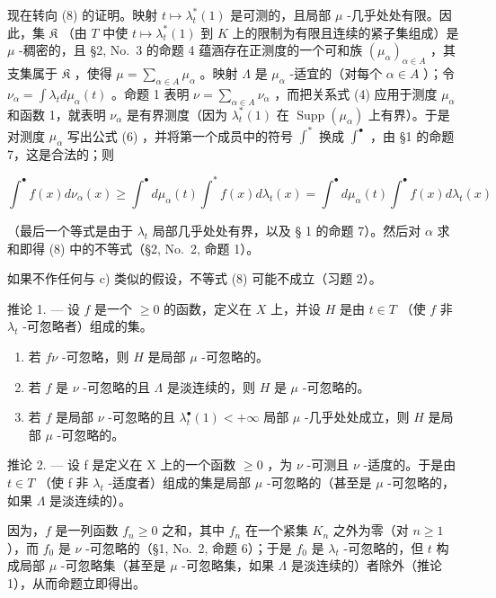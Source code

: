 现在转向 (8) 的证明。映射 \(t \mapsto \lambda_t^*(1)\) 是可测的，且局部 \(\mu\) -几乎处处有限。因此，集 \(\mathfrak{K}\) （由 \(T\) 中使 \(t \mapsto \lambda_t^*(1)\) 到 \(K\) 上的限制为有限且连续的紧子集组成）是 \(\mu\) -稠密的，且 §2, No.~3 的命题 4 蕴涵存在正测度的一个可和族 \((\mu_\alpha)_{\alpha \in A}\) ，其支集属于 \(\mathfrak{K}\) ，使得 \(\mu = \sum_{\alpha \in A} \mu_\alpha\) 。映射 \(\Lambda\) 是 \(\mu_\alpha\) -适宜的（对每个 \(\alpha \in A\) ）；令 \(\nu_\alpha = \int \lambda_t d\mu_\alpha(t)\) 。命题 1 表明 \(\nu = \sum_{\alpha \in A} \nu_\alpha\) ，而把关系式 (4) 应用于测度 \(\mu_\alpha\) 和函数 1，就表明 \(\nu_\alpha\) 是有界测度（因为 \(\lambda_t^*(1)\) 在 \(\operatorname{Supp}(\mu_\alpha)\) 上有界）。于是对测度 \(\mu_\alpha\) 写出公式 (6) ，并将第一个成员中的符号 \(\int^*\) 换成 \(\int^\bullet\) ，由 §1 的命题 7，这是合法的；则

\[
\int^ {\bullet} f (x) d \nu_ {\alpha} (x) \geqslant \int^ {\bullet} d \mu_ {\alpha} (t) \int^ {*} f (x) d \lambda_ {t} (x) = \int^ {\bullet} d \mu_ {\alpha} (t) \int^ {\bullet} f (x) d \lambda_ {t} (x)
\]

（最后一个等式是由于 \(\lambda_t\) 局部几乎处处有界，以及 § 1 的命题 7）。然后对 \(\alpha\) 求和即得 (8) 中的不等式（§2, No.~2, 命题 1）。

如果不作任何与 c) 类似的假设，不等式 (8) 可能不成立（习题 2）。

推论 1. --- 设 \(f\) 是一个 \(\geqslant 0\) 的函数，定义在 \(X\) 上，并设 \(H\) 是由 \(t \in T\) （使 \(f\) 非 \(\lambda_t\) -可忽略者）组成的集。

\begin{enumerate}
\def\labelenumi{\alph{enumi})}
\item
  若 \(f \nu\) -可忽略，则 \(H\) 是局部 \(\mu\) -可忽略的。
\item
  若 \(f\) 是 \(\nu\) -可忽略的且 \(\Lambda\) 是淡连续的，则 \(H\) 是 \(\mu\) -可忽略的。
\item
  若 \(f\) 是局部 \(\nu\) -可忽略的且 \(\lambda_t^\bullet(1) < +\infty\) 局部 \(\mu\) -几乎处处成立，则 \(H\) 是局部 \(\mu\) -可忽略的。
\end{enumerate}

推论 2. --- 设 f 是定义在 X 上的一个函数 \(\geqslant0\) ，为 \(\nu\) -可测且 \(\nu\) -适度的。于是由 \(t\in T\) （使 f 非 \(\lambda_{t}\) -适度者）组成的集是局部 \(\mu\) -可忽略的（甚至是 \(\mu\) -可忽略的，如果 \(\Lambda\) 是淡连续的）。

因为，\(f\) 是一列函数 \(f_{n} \geqslant 0\) 之和，其中 \(f_{n}\) 在一个紧集 \(K_{n}\) 之外为零（对 \(n \geqslant 1\) ），而 \(f_{0}\) 是 \(\nu\) -可忽略的（§1, No.~2, 命题 6）；于是 \(f_{0}\) 是 \(\lambda_{t}\) -可忽略的，但 \(t\) 构成局部 \(\mu\) -可忽略集（甚至是 \(\mu\) -可忽略集，如果 \(\Lambda\) 是淡连续的）者除外（推论 1），从而命题立即得出。


